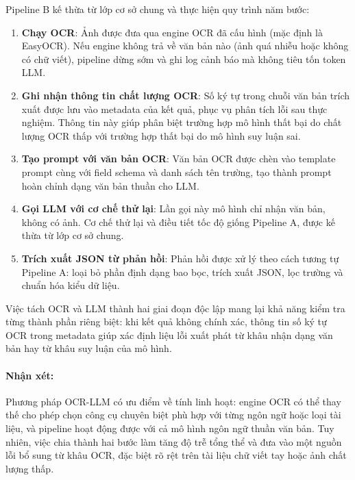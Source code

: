 ﻿\documentclass[12pt]{report}
\begin{document}
Pipeline B kế thừa từ lớp cơ sở chung và thực hiện quy trình năm bước:

\begin{enumerate}
    \item \textbf{Chạy OCR}: Ảnh được đưa qua engine OCR đã cấu hình (mặc định là EasyOCR). Nếu engine không trả về văn bản nào (ảnh quá nhiễu hoặc không có chữ viết), pipeline dừng sớm và ghi log cảnh báo mà không tiêu tốn token LLM.

    \item \textbf{Ghi nhận thông tin chất lượng OCR}: Số ký tự trong chuỗi văn bản trích xuất được lưu vào metadata của kết quả, phục vụ phân tích lỗi sau thực nghiệm. Thông tin này giúp phân biệt trường hợp mô hình thất bại do chất lượng OCR thấp với trường hợp thất bại do mô hình suy luận sai.

    \item \textbf{Tạo prompt với văn bản OCR}: Văn bản OCR được chèn vào template prompt cùng với field schema và danh sách tên trường, tạo thành prompt hoàn chỉnh dạng văn bản thuần cho LLM.

    \item \textbf{Gọi LLM với cơ chế thử lại}: Lần gọi này mô hình chỉ nhận văn bản, không có ảnh. Cơ chế thử lại và điều tiết tốc độ giống Pipeline A, được kế thừa từ lớp cơ sở chung.

    \item \textbf{Trích xuất JSON từ phản hồi}: Phản hồi được xử lý theo cách tương tự Pipeline A: loại bỏ phần định dạng bao bọc, trích xuất JSON, lọc trường và chuẩn hóa kiểu dữ liệu.
\end{enumerate}

Việc tách OCR và LLM thành hai giai đoạn độc lập mang lại khả năng kiểm tra từng thành phần riêng biệt: khi kết quả không chính xác, thông tin số ký tự OCR trong metadata giúp xác định liệu lỗi xuất phát từ khâu nhận dạng văn bản hay từ khâu suy luận của mô hình.

\paragraph{Nhận xét:}
Phương pháp OCR-LLM có ưu điểm về tính linh hoạt: engine OCR có thể thay thế cho phép chọn công cụ chuyên biệt phù hợp với từng ngôn ngữ hoặc loại tài liệu, và pipeline hoạt động được với cả mô hình ngôn ngữ thuần văn bản. Tuy nhiên, việc chia thành hai bước làm tăng độ trễ tổng thể và đưa vào một nguồn lỗi bổ sung từ khâu OCR, đặc biệt rõ rệt trên tài liệu chữ viết tay hoặc ảnh chất lượng thấp.
\end{document}
